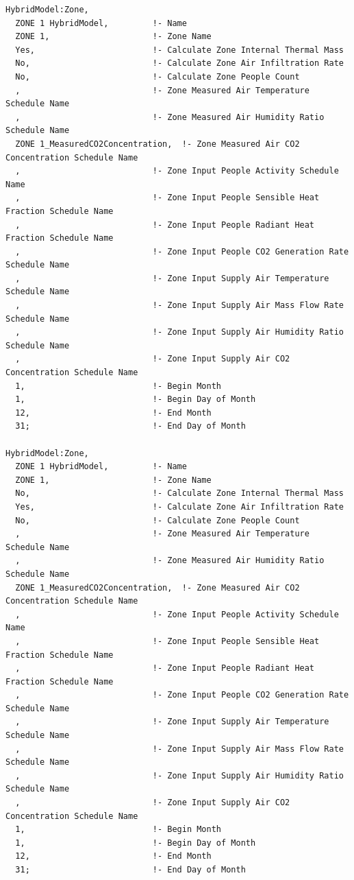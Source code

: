\begin{lstlisting}
HybridModel:Zone,
  ZONE 1 HybridModel,         !- Name
  ZONE 1,                     !- Zone Name
  Yes,                        !- Calculate Zone Internal Thermal Mass
  No,                         !- Calculate Zone Air Infiltration Rate
  No,                         !- Calculate Zone People Count
  ,                           !- Zone Measured Air Temperature Schedule Name
  ,                           !- Zone Measured Air Humidity Ratio Schedule Name
  ZONE 1_MeasuredCO2Concentration,  !- Zone Measured Air CO2 Concentration Schedule Name
  ,                           !- Zone Input People Activity Schedule Name
  ,                           !- Zone Input People Sensible Heat Fraction Schedule Name
  ,                           !- Zone Input People Radiant Heat Fraction Schedule Name
  ,                           !- Zone Input People CO2 Generation Rate Schedule Name
  ,                           !- Zone Input Supply Air Temperature Schedule Name
  ,                           !- Zone Input Supply Air Mass Flow Rate Schedule Name
  ,                           !- Zone Input Supply Air Humidity Ratio Schedule Name
  ,                           !- Zone Input Supply Air CO2 Concentration Schedule Name
  1,                          !- Begin Month
  1,                          !- Begin Day of Month
  12,                         !- End Month
  31;                         !- End Day of Month

HybridModel:Zone,
  ZONE 1 HybridModel,         !- Name
  ZONE 1,                     !- Zone Name
  No,                         !- Calculate Zone Internal Thermal Mass
  Yes,                        !- Calculate Zone Air Infiltration Rate
  No,                         !- Calculate Zone People Count
  ,                           !- Zone Measured Air Temperature Schedule Name
  ,                           !- Zone Measured Air Humidity Ratio Schedule Name
  ZONE 1_MeasuredCO2Concentration,  !- Zone Measured Air CO2 Concentration Schedule Name
  ,                           !- Zone Input People Activity Schedule Name
  ,                           !- Zone Input People Sensible Heat Fraction Schedule Name
  ,                           !- Zone Input People Radiant Heat Fraction Schedule Name
  ,                           !- Zone Input People CO2 Generation Rate Schedule Name
  ,                           !- Zone Input Supply Air Temperature Schedule Name
  ,                           !- Zone Input Supply Air Mass Flow Rate Schedule Name
  ,                           !- Zone Input Supply Air Humidity Ratio Schedule Name
  ,                           !- Zone Input Supply Air CO2 Concentration Schedule Name
  1,                          !- Begin Month
  1,                          !- Begin Day of Month
  12,                         !- End Month
  31;                         !- End Day of Month


\end{lstlisting}
